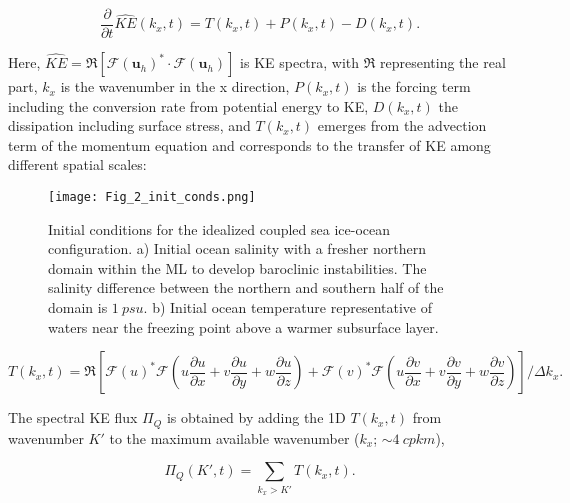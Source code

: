 \documentclass[draft]{agujournal2019}
\begin{document}
\begin{linenomath*}
\begin{equation}
  \frac{\partial}{\partial t}  \widehat{KE} (k_x,t) = T(k_x,t) + P(k_x,t) - D(k_x,t).
  \label{eq:eq5}
\end{equation}
\end{linenomath*}
Here, $\widehat{KE}=\Re \left[\mathcal{F}(\mathbf{u}_h)^* \cdot \mathcal{F}(\mathbf{u}_h) \right]$ is KE spectra, with $\Re$ representing the real part, $k_x$ is the wavenumber in the x direction, $P(k_x,t)$ is the forcing term including the conversion rate from potential energy to KE, $D(k_x,t)$  the dissipation including surface stress, and $T(k_x,t)$ emerges from the advection term of the momentum equation and corresponds to the transfer of KE among different spatial scales:

\begin{figure}[t]
  \texttt{[image: Fig\_2\_init\_conds.png]}
  \caption{Initial conditions for the idealized coupled sea ice-ocean configuration. a) Initial ocean salinity with a fresher northern domain within the ML to develop baroclinic instabilities. The salinity difference between the northern and southern half of the domain is $1\ psu$. b) Initial ocean temperature representative of waters near the freezing point above a warmer subsurface layer.}
  \label{fig:fig_2}
\end{figure}

\begin{linenomath*}
\begin{equation}
  T(k_x,t) = \Re \left[ \mathcal{F}(u) ^* \mathcal{F}\left(u\frac{\partial u}{\partial x} + v\frac{\partial u}{\partial y} + w\frac{\partial u}{\partial z}\right) + \mathcal{F}(v) ^* \mathcal{F}\left(u\frac{\partial v}{\partial x} + v\frac{\partial v}{\partial y} + w\frac{\partial v }{\partial z}\right)  \right] / \Delta k_x.
  \label{eq:eq6}
\end{equation}
\end{linenomath*}
The spectral KE flux $\Pi_Q$ is obtained by adding the 1D $T(k_x,t)$ from wavenumber $K'$ to the maximum available wavenumber ($k_x$; $\sim 4\ cpkm$),
\begin{linenomath*}
\begin{equation}
  \Pi_Q (K', t) = \sum_{k_x>K'}T(k_x,t). %
  \label{eq:eq7}
\end{equation}
\end{linenomath*}
\end{document}
